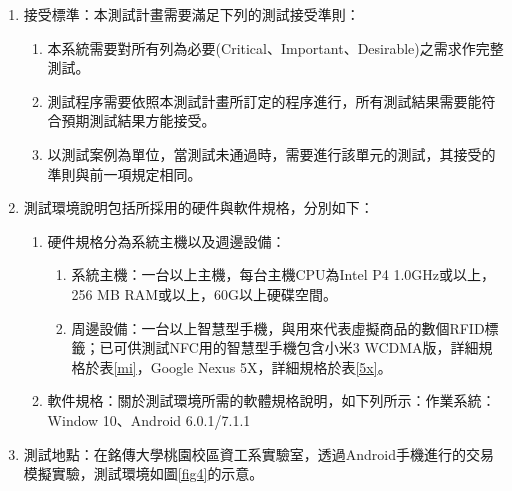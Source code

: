 	 		\begin{enumerate}
	 			
	 			\item 接受標準：本測試計畫需要滿足下列的測試接受準則： 

	 			\begin{enumerate}
					\item 本系統需要對所有列為必要(Critical、Important、Desirable)之需求作完整測試。
					\item 測試程序需要依照本測試計畫所訂定的程序進行，所有測試結果需要能符合預期測試結果方能接受。
					\item 以測試案例為單位，當測試未通過時，需要進行該單元的測試，其接受的準則與前一項規定相同。 
				\end{enumerate}

				\item 測試環境說明包括所採用的硬件與軟件規格，分別如下：
				\begin{enumerate}
					\item 硬件規格分為系統主機以及週邊設備：
					
					\begin{enumerate}
						\item 系統主機：一台以上主機，每台主機CPU為Intel P4 1.0GHz或以上，256 MB RAM或以上，60G以上硬碟空間。
						\item 周邊設備：一台以上智慧型手機，與用來代表虛擬商品的數個RFID標籤；已可供測試NFC用的智慧型手機包含小米3 WCDMA版，詳細規格於表\ref{mi}，Google Nexus 5X，詳細規格於表\ref{5x}。
					
					\end{enumerate}
					\item 軟件規格：關於測試環境所需的軟體規格說明，如下列所示：作業系統：Window 10、Android 6.0.1/7.1.1

				\end{enumerate}
				\item 測試地點：在銘傳大學桃園校區資工系實驗室，透過Android手機進行的交易模擬實驗，測試環境如圖\ref{fig4}的示意。

	 	


\end{enumerate}

